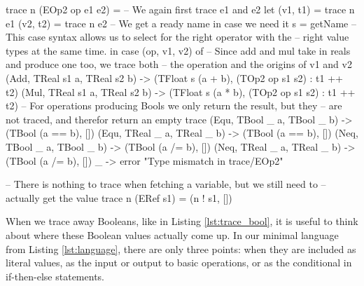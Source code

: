 \begin{haskell}[caption=Tracing away Boolean values, label=lst:trace_bool, gobble=12]
            trace n (EOp2 op e1 e2) =
                -- We again first trace e1 and e2
                let (v1, t1) = trace n e1
                    (v2, t2) = trace n e2
                    -- We get a ready name in case we need it
                    s = getName
                -- This case syntax allows us to select for the right operator with the 
                -- right value types at the same time.
                in  case (op, v1, v2) of
                    -- Since add and mul take in reals and produce one too, we trace both 
                    -- the operation and the origins of v1 and v2
                    (Add, TReal s1 a, TReal s2 b) -> (TFloat s (a + b),
                        (TOp2 op s1 s2) : t1 ++ t2)
                    (Mul, TReal s1 a, TReal s2 b) -> (TFloat s (a * b),
                        (TOp2 op s1 s2) : t1 ++ t2)
                    -- For operations producing Bools we only return the result, but they
                    -- are not traced, and therefor return an empty trace
                    (Equ, TBool _  a, TBool _  b) -> (TBool (a == b), [])
                    (Equ, TReal _  a, TReal _  b) -> (TBool (a == b), [])
                    (Neq, TBool _  a, TBool _  b) -> (TBool (a /= b), [])
                    (Neq, TReal _  a, TReal _  b) -> (TBool (a /= b), [])
                    _                             -> error "Type mismatch in trace/EOp2"

            -- There is nothing to trace when fetching a variable, but we still need to
            -- actually get the value
            trace n (ERef s1) = (n ! s1, [])
        \end{haskell}

        When we trace away Booleans, like in Listing \ref{lst:trace_bool}, it is useful to think about where these Boolean values actually come up.
        In our minimal language from Listing \ref{lst:language}, there are only three points: when they are included as literal values, as the input or output to basic operations, or as the conditional in if-then-else statements.
        
